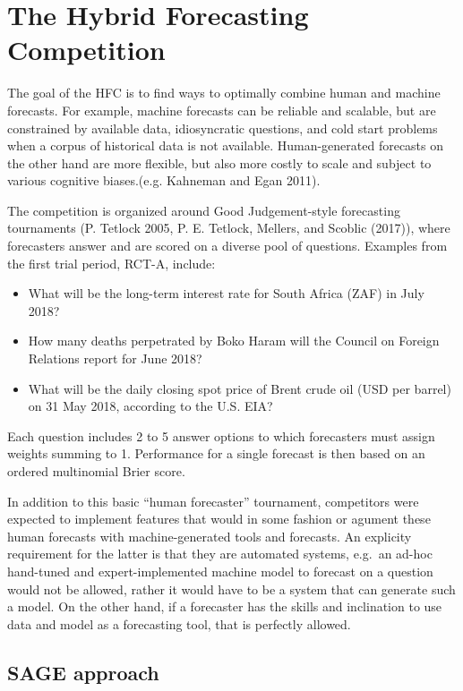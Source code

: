 \documentclass[]{article}
\providecommand{\tightlist}{%
  \setlength{\itemsep}{0pt}\setlength{\parskip}{0pt}}
\begin{document}
\section{The Hybrid Forecasting
Competition}\label{the-hybrid-forecasting-competition}

The goal of the HFC is to find ways to optimally combine human and
machine forecasts. For example, machine forecasts can be reliable and
scalable, but are constrained by available data, idiosyncratic
questions, and cold start problems when a corpus of historical data is
not available. Human-generated forecasts on the other hand are more
flexible, but also more costly to scale and subject to various cognitive
biases.(e.g. Kahneman and Egan 2011).

The competition is organized around Good Judgement-style forecasting
tournaments (P. Tetlock 2005, P. E. Tetlock, Mellers, and Scoblic
(2017)), where forecasters answer and are scored on a diverse pool of
questions. Examples from the first trial period, RCT-A, include:

\begin{itemize}
\tightlist
\item
  What will be the long-term interest rate for South Africa (ZAF) in
  July 2018?
\item
  How many deaths perpetrated by Boko Haram will the Council on Foreign
  Relations report for June 2018?
\item
  What will be the daily closing spot price of Brent crude oil (USD per
  barrel) on 31 May 2018, according to the U.S. EIA?
\end{itemize}

Each question includes 2 to 5 answer options to which forecasters must
assign weights summing to 1. Performance for a single forecast is then
based on an ordered multinomial Brier score.

In addition to this basic ``human forecaster'' tournament, competitors
were expected to implement features that would in some fashion or
agument these human forecasts with machine-generated tools and
forecasts. An explicity requirement for the latter is that they are
automated systems, e.g.~an ad-hoc hand-tuned and expert-implemented
machine model to forecast on a question would not be allowed, rather it
would have to be a system that can generate such a model. On the other
hand, if a forecaster has the skills and inclination to use data and
model as a forecasting tool, that is perfectly allowed.

\subsection{SAGE approach}\label{sage-approach}
\end{document}
